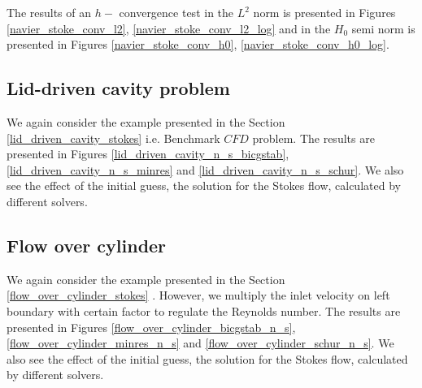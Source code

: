 \documentclass[a4paper]{book}
\begin{document}
The results of an $h-$ convergence test in the $L^2$ norm is presented in Figures \ref{navier_stoke_conv_l2}, \ref{navier_stoke_conv_l2_log} and in the $H_0$ semi norm is presented in Figures \ref{navier_stoke_conv_h0}, \ref{navier_stoke_conv_h0_log}. \\

\subsection{Lid-driven cavity problem} \label{lid_driven_cavity_navier_stokes}

We again consider the example presented in the Section \ref{lid_driven_cavity_stokes} i.e. Benchmark $CFD$ problem. The results are presented in Figures \ref{lid_driven_cavity_n_s_bicgstab}, \ref{lid_driven_cavity_n_s_minres} and \ref{lid_driven_cavity_n_s_schur}. We also see the effect of the initial guess, the solution for the Stokes flow, calculated by different solvers.

\subsection{Flow over cylinder} \label{flow_over_cylinder_navier_stokes}

We again consider the example presented in the Section \ref{flow_over_cylinder_stokes} . However, we multiply the inlet velocity on left boundary with certain factor to regulate the Reynolds number. The results are presented in Figures \ref{flow_over_cylinder_bicgstab_n_s}, \ref{flow_over_cylinder_minres_n_s} and \ref{flow_over_cylinder_schur_n_s}. We also see the effect of the initial guess, the solution for the Stokes flow, calculated by different solvers. 
\end{document}
